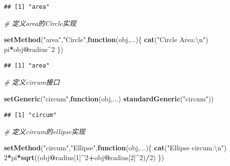 \documentclass[]{book}
\newenvironment{Shaded}{\begin{snugshade}}{\end{snugshade}}
\newcommand{\KeywordTok}[1]{\textcolor[rgb]{0.13,0.29,0.53}{\textbf{#1}}}
\newcommand{\DecValTok}[1]{\textcolor[rgb]{0.00,0.00,0.81}{#1}}
\newcommand{\CharTok}[1]{\textcolor[rgb]{0.31,0.60,0.02}{#1}}
\newcommand{\StringTok}[1]{\textcolor[rgb]{0.31,0.60,0.02}{#1}}
\newcommand{\CommentTok}[1]{\textcolor[rgb]{0.56,0.35,0.01}{\textit{#1}}}
\newcommand{\ControlFlowTok}[1]{\textcolor[rgb]{0.13,0.29,0.53}{\textbf{#1}}}
\newcommand{\OperatorTok}[1]{\textcolor[rgb]{0.81,0.36,0.00}{\textbf{#1}}}
\newcommand{\NormalTok}[1]{#1}
\begin{document}
\begin{verbatim}
## [1] "area"
\end{verbatim}

\begin{Shaded}
\begin{Highlighting}[]
\CommentTok{# 定义area的Circle实现}

\KeywordTok{setMethod}\NormalTok{(}\StringTok{"area"}\NormalTok{,}\StringTok{"Circle"}\NormalTok{,}\ControlFlowTok{function}\NormalTok{(obj,...)\{}
  \KeywordTok{cat}\NormalTok{(}\StringTok{"Circle Area:}\CharTok{\textbackslash{}n}\StringTok{"}\NormalTok{)}
\NormalTok{  pi}\OperatorTok{*}\NormalTok{obj}\OperatorTok{@}\NormalTok{radius}\OperatorTok{^}\DecValTok{2}
\NormalTok{\})}
\end{Highlighting}
\end{Shaded}

\begin{verbatim}
## [1] "area"
\end{verbatim}

\begin{Shaded}
\begin{Highlighting}[]
\CommentTok{# 定义circum接口}

\KeywordTok{setGeneric}\NormalTok{(}\StringTok{"circum"}\NormalTok{,}\ControlFlowTok{function}\NormalTok{(obj,...) }\KeywordTok{standardGeneric}\NormalTok{(}\StringTok{"circum"}\NormalTok{))}
\end{Highlighting}
\end{Shaded}

\begin{verbatim}
## [1] "circum"
\end{verbatim}

\begin{Shaded}
\begin{Highlighting}[]
\CommentTok{# 定义circum的ellipse实现}

\KeywordTok{setMethod}\NormalTok{(}\StringTok{"circum"}\NormalTok{,}\StringTok{"Ellipse"}\NormalTok{,}\ControlFlowTok{function}\NormalTok{(obj,...)\{}
  \KeywordTok{cat}\NormalTok{(}\StringTok{"Ellipse circum:}\CharTok{\textbackslash{}n}\StringTok{"}\NormalTok{)}
  \DecValTok{2}\OperatorTok{*}\NormalTok{pi}\OperatorTok{*}\KeywordTok{sqrt}\NormalTok{((obj}\OperatorTok{@}\NormalTok{radius[}\DecValTok{1}\NormalTok{]}\OperatorTok{^}\DecValTok{2}\OperatorTok{+}\NormalTok{obj}\OperatorTok{@}\NormalTok{radius[}\DecValTok{2}\NormalTok{]}\OperatorTok{^}\DecValTok{2}\NormalTok{)}\OperatorTok{/}\DecValTok{2}\NormalTok{)}
\NormalTok{\})}
\end{Highlighting}
\end{Shaded}
\end{document}
